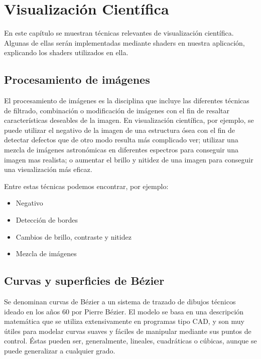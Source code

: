 \cleardoublepage

\chapter{Visualización Científica}
\label{makereference4}

En este capítulo se muestran técnicas relevantes de visualización científica.
Algunas de ellas serán implementadas mediante shaders en nuestra aplicación,
explicando los shaders utilizados en ella.

\section{Procesamiento de imágenes}
\label{ref:images}


El procesamiento de imágenes es la disciplina que incluye las diferentes
técnicas de filtrado, combinación o modificación de imágenes con el fin de
resaltar características deseables de la imagen. En visualización científica,
por ejemplo, se puede utilizar el negativo de la imagen de una estructura ósea
con el fin de detectar defectos que de otro modo resulta más complicado ver;
utilizar una mezcla de imágenes astronómicas en diferentes espectros para
conseguir una imagen mas realista; o aumentar el brillo y nitidez de una imagen
para conseguir una visualización más eficaz. 

Entre estas técnicas podemos encontrar, por ejemplo:

\begin{itemize}
		\item Negativo
		\item Detección de bordes
		\item Cambios de brillo, contraste y nitidez
		\item Mezcla de imágenes
\end{itemize}

\section{Curvas y superficies de Bézier}
\label{ref:bezier}

Se denominan curvas de Bézier a un sistema de trazado de dibujos técnicos ideado
en los años 60 por Pierre Bézier. El modelo se basa en una descripción
matemática que se utiliza extensivamente en programas tipo CAD, y son muy útiles
para modelar curvas suaves y fáciles de manipular mediante sus puntos de
control. Éstas pueden ser, generalmente, lineales, cuadráticas o cúbicas, aunque
se puede generalizar a cualquier grado. 

